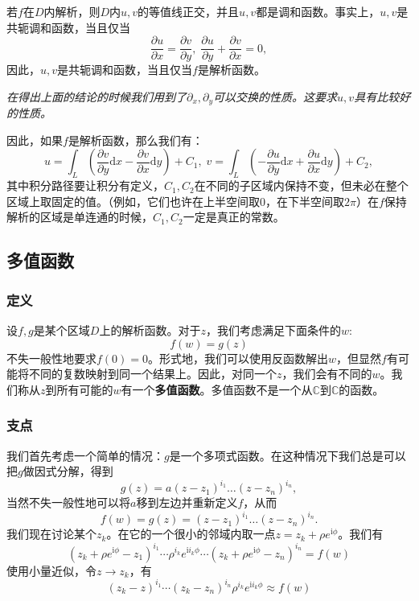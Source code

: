 若$f$在$D$内解析，则$D$内$u,v$的等值线正交，并且$u, v$都是调和函数。事实上，$u, v$是共轭调和函数，当且仅当
\[
\frac{\partial u}{\partial x} = \frac{\partial v}{\partial y}, \; \frac{\partial u}{\partial y} + \frac{\partial v}{\partial x} = 0,
\] 因此，$u, v$是共轭调和函数，当且仅当$f$是解析函数。

\emph{在得出上面的结论的时候我们用到了$\partial_x, \partial_y$可以交换的性质。这要求$u, v$具有比较好的性质。}

因此，如果$f$是解析函数，那么我们有： \[
u = \int_L (\frac{\partial v}{\partial y} \mathrm{d}x - \frac{\partial v}{\partial x} \mathrm{d}y) + C_1, \; 
v = \int_L (-\frac{\partial u}{\partial y}\mathrm{d}x + \frac{\partial u}{\partial x} \mathrm{d}y) + C_2,
\]
其中积分路径要让积分有定义，$C_1, C_2$在不同的子区域内保持不变，但未必在整个区域上取固定的值。（例如，它们也许在上半空间取0，在下半空间取$2\pi$）在$f$保持解析的区域是单连通的时候，$C_1, C_2$一定是真正的常数。

\hypertarget{ux591aux503cux51fdux6570}{%
\subsection{多值函数}\label{ux591aux503cux51fdux6570}}

\hypertarget{ux5b9aux4e49}{%
\subsubsection{定义}\label{ux5b9aux4e49}}

设$f, g$是某个区域$D$上的解析函数。对于$z$，我们考虑满足下面条件的$w$:
\[
f(w) = g(z)
\]
不失一般性地要求$f(0)=0$。形式地，我们可以使用反函数解出$w$，但显然$f$有可能将不同的复数映射到同一个结果上。因此，对同一个$z$，我们会有不同的$w$。我们称从$z$到所有可能的$w$有一个\textbf{多值函数}。多值函数不是一个从$\mathbb{C}$到$\mathbb{C}$的函数。

\hypertarget{ux652fux70b9}{%
\subsubsection{支点}\label{ux652fux70b9}}

我们首先考虑一个简单的情况：$g$是一个多项式函数。在这种情况下我们总是可以把$g$做因式分解，得到
\[
g(z) = a (z - z_1)^{i_1} \ldots (z - z_n)^{i_n},
\] 当然不失一般性地可以将$a$移到左边并重新定义$f$，从而 \[
f(w) = g(z) = (z - z_1)^{i_1} \ldots (z - z_n)^{i_n}.
\]
我们现在讨论某个$z_k$。在它的一个很小的邻域内取一点$z=z_k + \rho e^{\mathrm{i}\phi}$。我们有
\[
(z_k + \rho e^{\mathrm{i}\phi} - z_1)^{i_1} \cdots \rho^{i_k} e^{\mathrm{i}i_k \phi} \cdots (z_k + \rho e^{\mathrm{i}\phi} - z_n)^{i_n} = f(w)
\] 使用小量近似，令$z \rightarrow z_k$，有 \[
(z_k - z)^{i_1} \cdots (z_k - z_n)^{i_n} \rho^{i_k} e^{\mathrm{i} i_k \phi} \approx f(w)
\]

